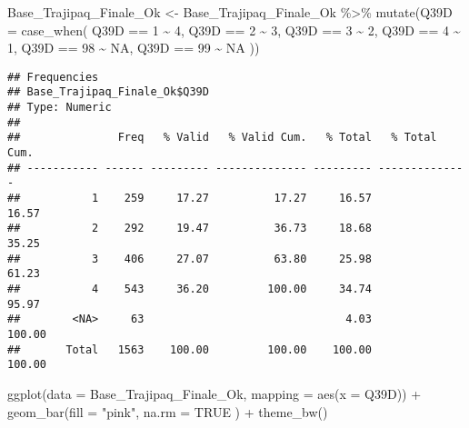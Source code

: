 \documentclass[
]{article}
\newenvironment{Shaded}{\begin{snugshade}}{\end{snugshade}}
\newcommand{\AttributeTok}[1]{\textcolor[rgb]{0.77,0.63,0.00}{#1}}
\newcommand{\ConstantTok}[1]{\textcolor[rgb]{0.00,0.00,0.00}{#1}}
\newcommand{\DecValTok}[1]{\textcolor[rgb]{0.00,0.00,0.81}{#1}}
\newcommand{\FunctionTok}[1]{\textcolor[rgb]{0.00,0.00,0.00}{#1}}
\newcommand{\NormalTok}[1]{#1}
\newcommand{\OtherTok}[1]{\textcolor[rgb]{0.56,0.35,0.01}{#1}}
\newcommand{\SpecialCharTok}[1]{\textcolor[rgb]{0.00,0.00,0.00}{#1}}
\newcommand{\StringTok}[1]{\textcolor[rgb]{0.31,0.60,0.02}{#1}}
\begin{document}
\begin{Shaded}
\begin{Highlighting}[]
\NormalTok{Base\_Trajipaq\_Finale\_Ok }\OtherTok{\textless{}{-}}
\NormalTok{  Base\_Trajipaq\_Finale\_Ok }\SpecialCharTok{\%\textgreater{}\%}
  \FunctionTok{mutate}\NormalTok{(}\AttributeTok{Q39D =} \FunctionTok{case\_when}\NormalTok{(}
\NormalTok{    Q39D }\SpecialCharTok{==} \DecValTok{1} \SpecialCharTok{\textasciitilde{}} \DecValTok{4}\NormalTok{,}
\NormalTok{    Q39D }\SpecialCharTok{==} \DecValTok{2} \SpecialCharTok{\textasciitilde{}} \DecValTok{3}\NormalTok{,}
\NormalTok{    Q39D }\SpecialCharTok{==} \DecValTok{3} \SpecialCharTok{\textasciitilde{}} \DecValTok{2}\NormalTok{,}
\NormalTok{    Q39D }\SpecialCharTok{==} \DecValTok{4} \SpecialCharTok{\textasciitilde{}} \DecValTok{1}\NormalTok{,}
\NormalTok{    Q39D }\SpecialCharTok{==} \DecValTok{98} \SpecialCharTok{\textasciitilde{}} \ConstantTok{NA}\NormalTok{,}
\NormalTok{    Q39D }\SpecialCharTok{==} \DecValTok{99} \SpecialCharTok{\textasciitilde{}} \ConstantTok{NA}
\NormalTok{  ))}
\end{Highlighting}
\end{Shaded}

\begin{Shaded}
\end{Shaded}

\begin{verbatim}
## Frequencies  
## Base_Trajipaq_Finale_Ok$Q39D  
## Type: Numeric  
## 
##               Freq   % Valid   % Valid Cum.   % Total   % Total Cum.
## ----------- ------ --------- -------------- --------- --------------
##           1    259     17.27          17.27     16.57          16.57
##           2    292     19.47          36.73     18.68          35.25
##           3    406     27.07          63.80     25.98          61.23
##           4    543     36.20         100.00     34.74          95.97
##        <NA>     63                               4.03         100.00
##       Total   1563    100.00         100.00    100.00         100.00
\end{verbatim}

\begin{Shaded}
\begin{Highlighting}[]
\FunctionTok{ggplot}\NormalTok{(}\AttributeTok{data =}\NormalTok{ Base\_Trajipaq\_Finale\_Ok, }\AttributeTok{mapping =} \FunctionTok{aes}\NormalTok{(}\AttributeTok{x =}\NormalTok{ Q39D)) }\SpecialCharTok{+}
  \FunctionTok{geom\_bar}\NormalTok{(}\AttributeTok{fill =} \StringTok{"pink"}\NormalTok{,}
           \AttributeTok{na.rm =} \ConstantTok{TRUE}
\NormalTok{           ) }\SpecialCharTok{+}
  \FunctionTok{theme\_bw}\NormalTok{()}
\end{Highlighting}
\end{Shaded}
\end{document}
